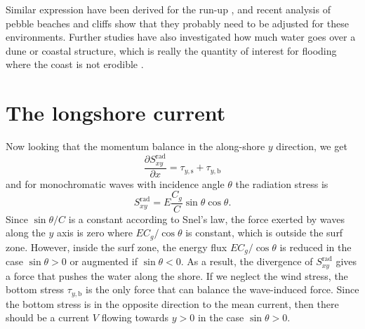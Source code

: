 Similar expression have been derived for the run-up \citep{Holman1986}, and recent analysis of pebble beaches \citep{Poate&al.2016} and cliffs \citep{Dodet&al.2018} show that they probably need to be adjusted for these environments. 
Further studies have also investigated how much water goes over a dune or coastal structure, which is really the quantity of interest for flooding where the coast is not erodible  \citep{EuroTop2007}. 


\section{The longshore current}
Now looking that the momentum balance in the along-shore $y$ direction, we get 
\begin{equation}
    \frac{\partial S^{\mathrm{rad}}_{xy}}{\partial x}
    = \tau_{y,{\mathrm s}}  + \tau_{y,{\mathrm b}} \label{ymomentum2}
\end{equation}
and for monochromatic waves with incidence angle $ \theta$ the radiation stress is 
\begin{equation}
    S^{\mathrm{rad}}_{xy}=E \frac{C_g}{C} \sin \theta \cos \theta .
\end{equation}
Since $\sin \theta/C$ is a constant according to Snel's law, the force exerted by waves along the $y$ axis is zero where $E C_g/\cos \theta$ is constant, which is outside the surf zone. However, inside the surf zone, the energy flux $E C_g/\cos \theta$  is reduced 
in the case $\sin \theta>0$ or augmented if 
$\sin \theta<0$. As a result, the divergence of $S_{xy}^{\mathrm{rad}}$ gives a force that pushes the water along the shore. If we neglect the wind stress, the bottom stress   $\tau_{y,{\mathrm b}}$ is the only force that can balance the wave-induced force. Since the bottom stress is in the opposite direction to the mean current, then there should be a current $V$ flowing towards $y>0$ in the case $\sin \theta>0$.

